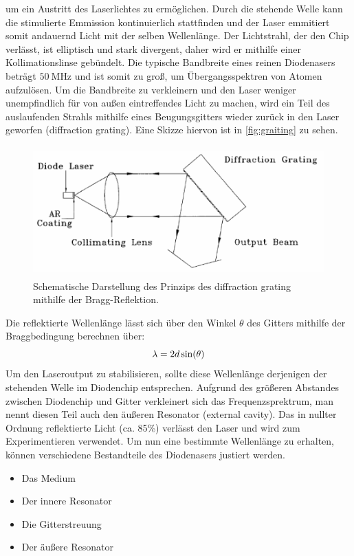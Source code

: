 um ein Austritt des Laserlichtes zu ermöglichen. Durch die stehende Welle kann die stimulierte Emmission kontinuierlich stattfinden
und der Laser emmitiert somit andauernd Licht mit der selben Wellenlänge.
Der Lichtstrahl, der den Chip verlässt, ist elliptisch und stark divergent, daher wird er mithilfe einer Kollimationslinse gebündelt.
Die typische Bandbreite eines reinen Diodenasers beträgt $\qty{50}{\mega\hertz}$ und ist somit zu groß, um Übergangsspektren
von Atomen aufzulösen.
Um die Bandbreite zu verkleinern und den Laser weniger unempfindlich für von außen eintreffendes Licht zu machen, wird ein
Teil des auslaufenden Strahls mithilfe eines Beugungsgitters wieder zurück in den Laser geworfen (diffraction grating).
Eine Skizze hiervon ist in \autoref{fig:graiting} zu sehen.
\begin{figure}[H]
    \centering
    \includegraphics[height=5cm]{content/pics/graiting.png}
    \caption{Schematische Darstellung des Prinzips des diffraction grating mithilfe der Bragg-Reflektion. \cite{V60}}
    \label{fig:graiting}
\end{figure}
Die reflektierte Wellenlänge lässt sich über den Winkel $\theta$ des Gitters mithilfe der Braggbedingung berechnen über:
\begin{equation}
    \notag
    \lambda = 2d \sin(\theta)
\end{equation}
Um den Laseroutput zu stabilisieren, sollte diese Wellenlänge derjenigen der stehenden Welle im Diodenchip entsprechen.
Aufgrund des größeren Abstandes zwischen Diodenchip und Gitter verkleinert sich das Frequenzsprektrum, man nennt diesen Teil
auch den äußeren Resonator (external cavity).
Das in nullter Ordnung reflektierte Licht (ca. 85\%) verlässt den Laser und wird zum Experimentieren verwendet.
Um nun eine bestimmte Wellenlänge zu erhalten, können verschiedene Bestandteile des Diodenasers justiert werden.
\begin{itemize}
    \item Das Medium
    \item Der innere Resonator
    \item Die Gitterstreuung
    \item Der äußere Resonator
\end{itemize}
